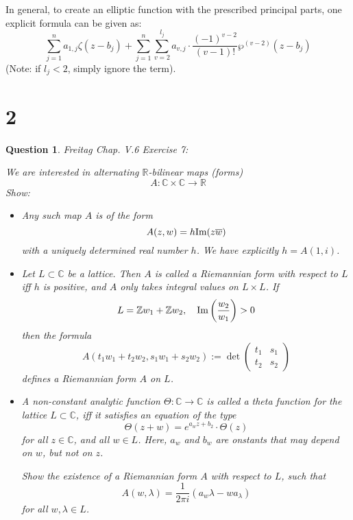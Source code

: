 \documentclass{article}
\newtheorem{question}{Question}
\begin{document}
\begin{itemize}
    \hfil

    In general, to create an elliptic function with the prescribed principal parts, one explicit formula can be given as:
    $$\sum_{j=1}^{n}a_{1,j}\zeta(z-b_j)+\sum_{j=1}^{n}\sum_{v=2}^{l_j}a_{v,j}\cdot\frac{(-1)^{v-2}}{(v-1)!}\wp^{(v-2)}(z-b_j)$$
    (Note: if $l_j<2$, simply ignore the term).
\end{itemize}

\break

\section*{2}
\begin{myBox}[]{}
    \begin{question}
        Freitag Chap. V.6 Exercise 7:

        We are interested in alternating $\mathbb{R}$-bilinear maps (forms)
        $$A:\mathbb{C}\times\mathbb{C}\rightarrow\mathbb{R}$$
        Show:
        \begin{itemize}
            \item[(a)] Any such map $A$ is of the form 
            $$A(z,w)=h\textmd{Im}(z\overline{w})$$
            with a uniquely determined real number $h$. We have explicitly $h=A(1,i)$.
            \item[(b)] Let $L\subset \mathbb{C}$ be a lattice. Then $A$ is called a \emph{Riemannian form} with respect to $L$ iff $h$ is positive, and $A$ only takes integral values on $L\times L$. If 
            $$L=\mathbb{Z}w_1+\mathbb{Z}w_2,\quad \textmd{Im}\left(\frac{w_2}{w_1}\right)>0$$
            then the formula 
            $$A(t_1w_1+t_2w_2,s_1w_1+s_2w_2):=\det\begin{pmatrix}t_1&s_1\\t_2&s_2\end{pmatrix}$$ defines a Riemannian form $A$ on $L$.
            \item[(c)] A non-constant analytic function $\Theta:\mathbb{C}\rightarrow\mathbb{C}$ is called a \emph{theta function} for the lattice $L\subset \mathbb{C}$, iff it satisfies an equation of the type 
            $$\Theta(z+w)=e^{a_wz+b_2}\cdot\Theta(z)$$ for all $z\in\mathbb{C}$, and all $w\in L$. Here, $a_w$ and $b_w$ are onstants that may depend on $w$, but not on $z$. 

            Show the existence of a Riemannian form $A$ with respect to $L$, such that 
            $$A(w,\lambda)=\frac{1}{2\pi i}(a_w\lambda - wa_\lambda)$$
            for all $w,\lambda\in L$.
        \end{itemize}
    \end{question}
\end{myBox}
\end{document}
